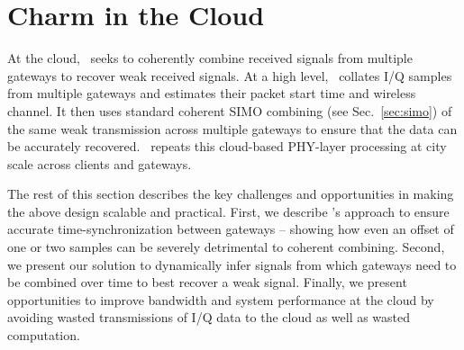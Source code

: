 \section{Charm in the Cloud}
\label{sec:cloud}


At the cloud, \name\ seeks to coherently combine received signals from multiple gateways to recover weak received signals. At a high level, \name\ collates I/Q samples from multiple gateways and estimates their packet start time and wireless channel. It then uses standard coherent SIMO combining (see Sec.~\ref{sec:simo}) of the same weak transmission across multiple gateways to ensure that the data can be accurately recovered. \name\ repeats this cloud-based PHY-layer processing at city scale across clients and gateways. 

The rest of this section describes the key challenges and opportunities in making the above design scalable and practical. First, we describe \name's approach to ensure accurate time-synchronization between gateways -- showing how even an offset of one or two samples can be severely detrimental to coherent combining. Second, we present our solution to dynamically infer signals from which gateways need to be combined over time to best recover a weak signal. Finally, we present opportunities to improve bandwidth and system performance at the cloud by avoiding wasted transmissions of I/Q data to the cloud as well as wasted computation.




